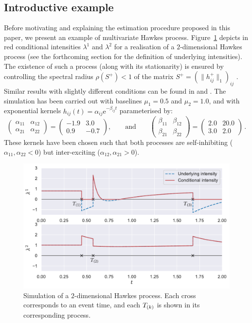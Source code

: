     \subsection{Introductive example}
    Before motivating and explaining the estimation procedure proposed in this paper, we present an example of multivariate Hawkes process.
    Figure~\ref{fig:chap2_2_dimension_example} depicts in red conditional intensities \(\lambda^1\) and \(\lambda^2\) for a realisation of a \(2\)-dimensional Hawkes process (see the forthcoming section for the definition of underlying intensities). The existence of such a process (along with its stationarity) is ensured by controlling the spectral radius $\rho(S^+) < 1$ of the matrix $S^+ = (\|h_{ij}^+\|_1)_{ij}$ \parencite{Deutsch2022}. Similar results with slightly different conditions can be found in \textcite{Bremaud1996} and \textcite{Sulem2021}.
    The simulation has been carried out with baselines \(\mu_1 = 0.5\) and \(\mu_2 = 1.0\),
    and with exponential kernels \(h_{ij}(t) = \alpha_{ij} \mathrm{e}^{-\beta_{ij}t}\) parameterised by:
    \[
      \begin{pmatrix}
      \alpha_{11} & \alpha_{12}\\
      \alpha_{21} & \alpha_{22}
      \end{pmatrix}=
      \begin{pmatrix}
      -1.9 & 3.0\\
      0.9 & -0.7
      \end{pmatrix},
      \qquad
      \text{and}
      \qquad
      \begin{pmatrix}
      \beta_{11} & \beta_{12}\\
      \beta_{21} & \beta_{22}
      \end{pmatrix} =
      \begin{pmatrix}
      2.0 & 20.0\\
      3.0 & 2.0
      \end{pmatrix}\,.
    \]
    These kernels have been chosen such that both processes are self-inhibiting ($\alpha_{11}, \alpha_{22} < 0$) but inter-exciting ($\alpha_{12}, \alpha_{21} > 0$).

    \begin{figure}[!ht]
    \centering
    \includegraphics[width=.75\linewidth]{images/chapter3/timesMarkedMulti.pdf}
    \caption{Simulation of a \(2\)-dimensional Hawkes process. Each cross corresponds to an event time, and each $T_{(k)}$ is shown in its corresponding process.}
    \label{fig:chap2_2_dimension_example}
    \end{figure}


